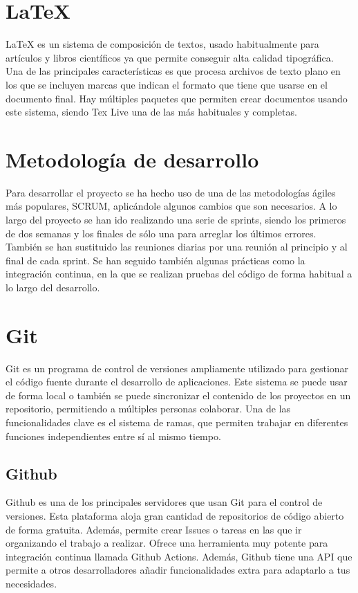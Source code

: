 \section{LaTeX}
LaTeX es un sistema de composición de textos, usado habitualmente para artículos y libros científicos ya que permite conseguir alta calidad tipográfica. Una de las principales características es que procesa archivos de texto plano en los que se incluyen marcas que indican el formato que tiene que usarse en el documento final.
Hay múltiples paquetes que permiten crear documentos usando este sistema, siendo Tex Live una de las más habituales y completas.

\section{Metodología de desarrollo}
Para desarrollar el proyecto se ha hecho uso de una de las metodologías ágiles más populares, SCRUM, aplicándole algunos cambios que son necesarios. A lo largo del proyecto se han ido realizando una serie de sprints, siendo los primeros de dos semanas y los finales de sólo una para arreglar los últimos errores. También se han sustituido las reuniones diarias por una reunión al principio y al final de cada sprint. Se han seguido también algunas prácticas como la integración continua, en la que se realizan pruebas del código de forma habitual a lo largo del desarrollo.

\section{Git}
Git es un programa de control de versiones ampliamente utilizado para gestionar el código fuente durante el desarrollo de aplicaciones. Este sistema se puede usar de forma local o también se puede sincronizar el contenido de los proyectos en un repositorio, permitiendo a múltiples personas colaborar. Una de las funcionalidades clave es el sistema de ramas, que permiten trabajar en diferentes funciones independientes entre sí al mismo tiempo.
\subsection{Github}
Github es una de los principales servidores que usan Git para el control de versiones. Esta plataforma aloja gran cantidad de repositorios de código abierto de forma gratuita. Además, permite crear Issues o tareas en las que ir organizando el trabajo a realizar. Ofrece una herramienta muy potente para integración continua llamada Github Actions. Además, Github tiene una API que permite a otros desarrolladores añadir funcionalidades extra para adaptarlo a tus necesidades.
